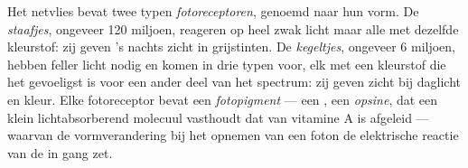 \begin{definition}[Fotoreceptoren]\label{def:g11:the-eye:photoreceptors}
Het netvlies bevat twee typen \emph{fotoreceptoren},
genoemd naar hun vorm. De \emph{staafjes}, ongeveer 120
miljoen, reageren op heel zwak licht maar alle met dezelfde kleurstof: zij
geven 's nachts zicht in grijstinten. De \emph{kegeltjes},
ongeveer 6 miljoen, hebben feller licht nodig en komen in drie typen
voor, elk met een kleurstof die het gevoeligst is voor een ander deel van
het spectrum: zij geven zicht bij daglicht en kleur. Elke fotoreceptor
bevat een \emph{fotopigment} --- een , een \emph{opsine},
dat een klein lichtabsorberend molecuul vasthoudt dat van vitamine A is
afgeleid --- waarvan de vormverandering bij het opnemen van een foton de
elektrische reactie van de  in gang zet.
\end{definition}

